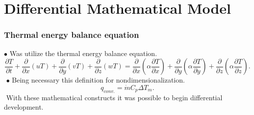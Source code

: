 \documentclass[xcolor=dvipsnames,8pt,aspectratio=34]{beamer}
\begin{document}
	

	
	\section{Differential Mathematical Model}
	
	
	
	
		

		



		\begin{frame}
		\frametitle{Thermal energy balance equation}
		$\bullet$ Was utilize the thermal energy balance equation.
		\begin{equation}
		\frac{\partial T}{\partial t} + {\frac{\partial{}}{\partial{x}} (uT)} + {\frac{\partial{}}{\partial{y}} (vT)} + {\frac{\partial{}}{\partial{z}} (wT)}
		=
		{\frac{\partial{}}{\partial{x}}} \left(\alpha {\frac{\partial{T}}{\partial{x}}} \right) +
		{\frac{\partial{}}{\partial{y}}} \left(\alpha {\frac{\partial{T}}{\partial{y}}} \right) +
		{\frac{\partial{}}{\partial{z}}} \left(\alpha {\frac{\partial{T}}{\partial{z}}} \right) .
		\end{equation}
		$ $
		$\bullet$ Being necessary this definition for nondimensionalization.
		\begin{equation}\label{c_h_e}
		q_{conv.} = \dot{m} C_p \Delta T_m.
		\end{equation}
		$ $
		With these mathematical constructs it was possible to begin differential development.
		\end{frame}
\end{document}
